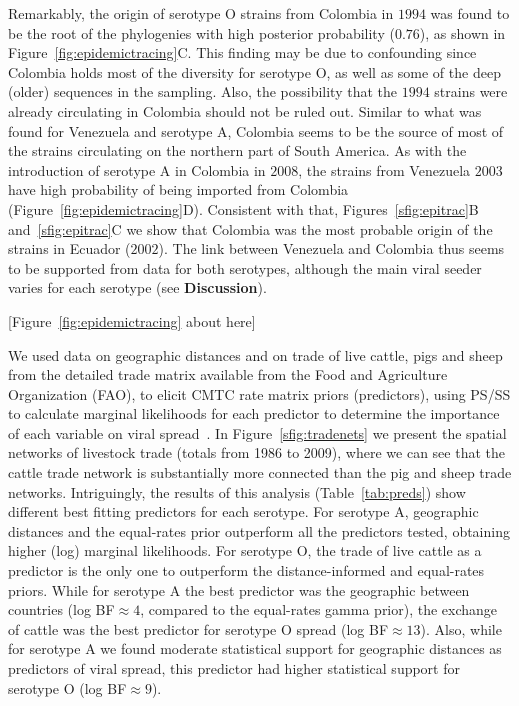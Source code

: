 \documentclass[10pt]{article}
\begin{document}
Remarkably, the origin of serotype O strains from Colombia in $1994$ was found to be the root of the phylogenies with high posterior probability ($0.76$), as shown in Figure~\ref{fig:epidemictracing}C.
This finding may be due to confounding since Colombia holds most of the diversity for serotype O, as well as some of the deep (older) sequences in the sampling.
Also, the  possibility that the $1994$ strains were already circulating in Colombia should not be ruled out.
Similar to what was found for Venezuela and serotype A, Colombia seems to be the source of most of the strains circulating on the northern part of South America.
As with the introduction of serotype A in Colombia in $2008$, the strains from Venezuela $2003$ have high probability of being imported from Colombia (Figure~\ref{fig:epidemictracing}D).
Consistent with that, Figures~\ref{sfig:epitrac}B and~\ref{sfig:epitrac}C we show that Colombia was the most probable origin of the strains in Ecuador ($2002$).
The link between Venezuela and Colombia thus seems to be supported from data for both serotypes, although the main viral seeder varies for each serotype (see \textbf{Discussion}).

\begin{center}
 [Figure~\ref{fig:epidemictracing} about here]
\end{center}

We used data on geographic distances and on trade of live cattle, pigs and sheep from the detailed trade matrix available from the Food and Agriculture Organization (FAO), to elicit CMTC rate matrix priors (predictors), using PS/SS to calculate marginal likelihoods for each predictor to determine the importance of each variable on viral spread~\cite{Carvalho2013, Nelson2011}.
In Figure~\ref{sfig:tradenets} we present the spatial networks of livestock trade (totals from 1986 to 2009), where we can see that the cattle trade network is substantially more connected than the pig and sheep trade networks.
Intriguingly, the results of this analysis (Table~\ref{tab:preds}) show different best fitting predictors for each serotype.
For serotype A, geographic distances and the equal-rates prior outperform all the predictors tested, obtaining higher (log) marginal likelihoods.
For serotype O, the trade of live cattle as a predictor is the only one to outperform the distance-informed and equal-rates  priors.
While for serotype A the best predictor was the geographic between countries (log BF$\approx 4$, compared to the equal-rates gamma prior), the exchange of cattle was the best predictor for serotype O spread (log BF$\approx 13$).
Also, while for serotype A we found moderate statistical support for geographic distances as predictors of viral spread, this predictor had higher statistical support for serotype O (log BF$\approx 9$).
\end{document}
